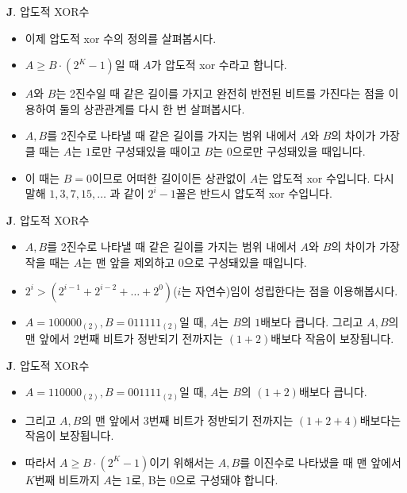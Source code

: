 \begin{frame}{\textbf{J}. 압도적 XOR수}
	\begin{itemize}
		\item 이제 압도적 xor 수의 정의를 살펴봅시다.
		\item $A \ge B \cdot (2^K - 1)$일 때 $A$가 압도적 xor 수라고 합니다. 
		\item $A$와 $B$는 2진수일 때 같은 길이를 가지고 완전히 반전된 비트를 가진다는 점을 이용하여 둘의 상관관계를 다시 한 번 살펴봅시다.
		\item $A, B$를 2진수로 나타낼 때 같은 길이를 가지는 범위 내에서 $A$와 $B$의 차이가 가장 클 때는 $A$는 $1$로만 구성돼있을 때이고 $B$는 $0$으로만 구성돼있을 때입니다. 
		\item 이 때는 $B = 0$이므로 어떠한 길이이든 상관없이 $A$는 압도적 xor 수입니다. 다시 말해 $1, 3, 7, 15, \dots$ 과 같이 $2^i - 1$꼴은 반드시 압도적 xor 수입니다.
	\end{itemize}
\end{frame}

\begin{frame}{\textbf{J}. 압도적 XOR수}
	\begin{itemize}
		\item $A, B$를 2진수로 나타낼 때 같은 길이를 가지는 범위 내에서 $A$와 $B$의 차이가 가장 작을 때는 $A$는 맨 앞을 제외하고 $0$으로 구성돼있을 때입니다. 
		\item $2^i > (2^{i-1} + 2^{i-2} + … + 2^0)$($i$는 자연수)임이 성립한다는 점을 이용해봅시다.
		\item $A = 100000_{(2)}, B = 011111_{(2)}$일 때, $A$는 $B$의 $1$배보다 큽니다. 그리고 $A, B$의 맨 앞에서 2번째 비트가 정반되기 전까지는 $(1+2)$배보다 작음이 보장됩니다.
	\end{itemize}
\end{frame}

\begin{frame}{\textbf{J}. 압도적 XOR수}
	\begin{itemize}
		\item $A = 110000_{(2)}, B = 001111_{(2)}$일 때, $A$는 $B$의 $(1+2)$배보다 큽니다. 
		\item 그리고 $A, B$의 맨 앞에서 3번째 비트가 정반되기 전까지는 $(1+2+4)$배보다는 작음이 보장됩니다.
		\item 따라서 $A \ge B \cdot (2^K - 1)$이기 위해서는 $A, B$를 이진수로 나타냈을 때 맨 앞에서 $K$번째 비트까지 $A$는 $1$로, B는 $0$으로 구성돼야 합니다. 
	\end{itemize}
\end{frame}

